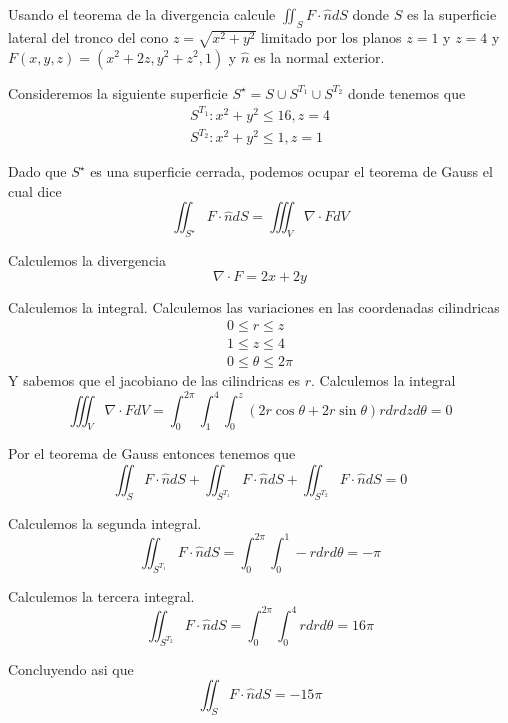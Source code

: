 \documentclass[../main.tex]{subfiles}
\begin{document}
\begin{problem}
  Usando el teorema de la divergencia calcule $\iint_{S} F \cdot \hat{n} dS$ donde $S$ es la superficie lateral
  del tronco del cono $z = \sqrt{x^{2} + y^{2}}$ limitado por los planos $z = 1$ y $z = 4$ y
  $F(x, y, z) = (x^{2} + 2z, y^{2} + z^{2}, 1)$ y $\hat{n}$ es la normal exterior.
\end{problem}
\begin{solution}
  Consideremos la siguiente superficie $S^{\star} = S \cup S^{T_{1}} \cup S^{T_{2}}$ donde tenemos que
  \begin{gather*}
    S^{T_{1}}: x^{2} + y^{2} \leq 16, z = 4\\
    S^{T_{2}}: x^{2} + y^{2} \leq 1, z = 1
  \end{gather*}

  Dado que $S^{\star}$ es una superficie cerrada, podemos ocupar el teorema de Gauss el cual dice
  \begin{equation*}
    \iint_{S^{\star}} F \cdot \hat{n} dS = \iiint_{V} \nabla \cdot F dV
  \end{equation*}

  Calculemos la divergencia
  \begin{equation*}
    \nabla \cdot F = 2x + 2y
  \end{equation*}

  Calculemos la integral. Calculemos las variaciones en las coordenadas cilindricas
  \begin{gather*}
    0 \leq r \leq z\\
    1 \leq z \leq 4\\
    0 \leq \theta \leq 2\pi
  \end{gather*}
  Y sabemos que el jacobiano de las cilindricas es $r$. Calculemos la integral
  \begin{equation*}
    \iiint_{V} \nabla \cdot F dV = \int_{0}^{2\pi}\int_{1}^{4}\int_{0}^{z} (2r \cos \theta + 2r \sin \theta) r dr dz d \theta = 0
  \end{equation*}

  Por el teorema de Gauss entonces tenemos que
  \begin{equation*}
    \iint_{S} F \cdot \hat{n} dS + \iint_{S^{T_{1}}} F \cdot \hat{n} dS + \iint_{S^{T_{2}}} F \cdot \hat{n} dS = 0
  \end{equation*}

  Calculemos la segunda integral.
  \begin{equation*}
    \iint_{S^{T_{1}}} F \cdot \hat{n} dS = \int_{0}^{2\pi}\int_{0}^{1} -r dr d\theta = -\pi
  \end{equation*}

  Calculemos la tercera integral.
  \begin{equation*}
    \iint_{S^{T_{2}}} F \cdot \hat{n} dS = \int_{0}^{2\pi}\int_{0}^{4} r dr d \theta = 16\pi
  \end{equation*}

  Concluyendo asi que
  \begin{equation*}
    \iint_{S} F \cdot \hat{n} dS = -15\pi
  \end{equation*}
\end{solution}
\end{document}
